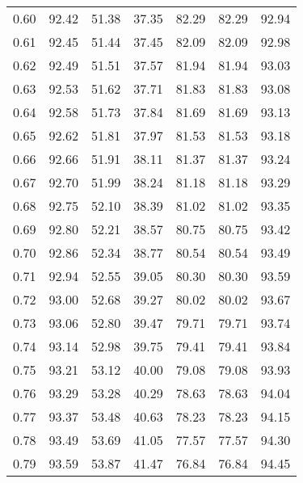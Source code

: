 \begin{tabular}{|c|c|c|c|c|c|c|}
      0.60 &     92.42 &     51.38 &      37.35 &   82.29 &      82.29 &         92.94 \\
      0.61 &     92.45 &     51.44 &      37.45 &   82.09 &      82.09 &         92.98 \\
      0.62 &     92.49 &     51.51 &      37.57 &   81.94 &      81.94 &         93.03 \\
      0.63 &     92.53 &     51.62 &      37.71 &   81.83 &      81.83 &         93.08 \\
      0.64 &     92.58 &     51.73 &      37.84 &   81.69 &      81.69 &         93.13 \\
      0.65 &     92.62 &     51.81 &      37.97 &   81.53 &      81.53 &         93.18 \\
      0.66 &     92.66 &     51.91 &      38.11 &   81.37 &      81.37 &         93.24 \\
      0.67 &     92.70 &     51.99 &      38.24 &   81.18 &      81.18 &         93.29 \\
      0.68 &     92.75 &     52.10 &      38.39 &   81.02 &      81.02 &         93.35 \\
      0.69 &     92.80 &     52.21 &      38.57 &   80.75 &      80.75 &         93.42 \\
      0.70 &     92.86 &     52.34 &      38.77 &   80.54 &      80.54 &         93.49 \\
      0.71 &     92.94 &     52.55 &      39.05 &   80.30 &      80.30 &         93.59 \\
      0.72 &     93.00 &     52.68 &      39.27 &   80.02 &      80.02 &         93.67 \\
      0.73 &     93.06 &     52.80 &      39.47 &   79.71 &      79.71 &         93.74 \\
      0.74 &     93.14 &     52.98 &      39.75 &   79.41 &      79.41 &         93.84 \\
      0.75 &     93.21 &     53.12 &      40.00 &   79.08 &      79.08 &         93.93 \\
      0.76 &     93.29 &     53.28 &      40.29 &   78.63 &      78.63 &         94.04 \\
      0.77 &     93.37 &     53.48 &      40.63 &   78.23 &      78.23 &         94.15 \\
      0.78 &     93.49 &     53.69 &      41.05 &   77.57 &      77.57 &         94.30 \\
      0.79 &     93.59 &     53.87 &      41.47 &   76.84 &      76.84 &         94.45 \\

\end{tabular}
